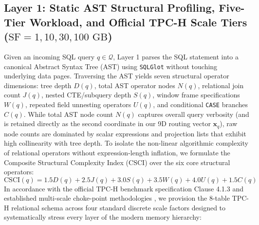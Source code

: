 \documentclass[10pt,a4paper]{article}
\begin{document}
\subsection{Layer 1: Static AST Structural Profiling, Five-Tier Workload, and Official TPC-H Scale Tiers ($\text{SF}=1, 10, 30, 100\text{ GB}$)}
Given an incoming SQL query $q \in \mathcal{Q}$, Layer 1 parses the SQL statement into a canonical Abstract Syntax Tree (AST) using \texttt{SQLGlot} \cite{mao2024sqlglot} without touching underlying data pages. Traversing the AST yields seven structural operator dimensions: tree depth $D(q)$, total AST operator nodes $N(q)$, relational join count $J(q)$, nested CTE/subquery depth $S(q)$, window frame specifications $W(q)$, repeated field unnesting operators $U(q)$, and conditional \texttt{CASE} branches $C(q)$. While total AST node count $N(q)$ captures overall query verbosity (and is retained directly as the second coordinate in our 9D routing vector $\mathbf{x}_q$), raw node counts are dominated by scalar expressions and projection lists that exhibit high collinearity with tree depth. To isolate the non-linear algorithmic complexity of relational operators without expression-length inflation, we formulate the Composite Structural Complexity Index ($\text{CSCI}$) over the six core structural operators:
\begin{equation}
    \text{CSCI}(q) = 1.5 D(q) + 2.5 J(q) + 3.0 S(q) + 3.5 W(q) + 4.0 U(q) + 1.5 C(q)
\end{equation}
In accordance with the official TPC-H benchmark specification Clause 4.1.3 \cite{tpc2022tpch} and established multi-scale choke-point methodologies \cite{boncz2014tpch, dreseler2020quantifying, kuiper2024duckdb_ooc}, we provision the 8-table TPC-H relational schema across four standard discrete scale factors designed to systematically stress every layer of the modern memory hierarchy:
\end{document}

